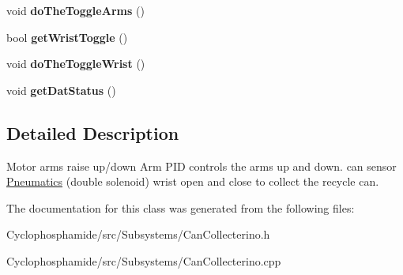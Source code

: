\begin{DoxyCompactItemize}
\item 
\hypertarget{class_can_collecterino_a62ef9056b5efd3bb50a1bc5fd60b1b05}{}void {\bfseries do\+The\+Toggle\+Arms} ()\label{class_can_collecterino_a62ef9056b5efd3bb50a1bc5fd60b1b05}

\item 
\hypertarget{class_can_collecterino_ab6ce305e5856f04f863e87b6df71a94d}{}bool {\bfseries get\+Wrist\+Toggle} ()\label{class_can_collecterino_ab6ce305e5856f04f863e87b6df71a94d}

\item 
\hypertarget{class_can_collecterino_a1ac8ee7f437264f34f37e94379d324dc}{}void {\bfseries do\+The\+Toggle\+Wrist} ()\label{class_can_collecterino_a1ac8ee7f437264f34f37e94379d324dc}

\item 
\hypertarget{class_can_collecterino_a66118988ad6367103a511e7bbf0a8a52}{}void {\bfseries get\+Dat\+Status} ()\label{class_can_collecterino_a66118988ad6367103a511e7bbf0a8a52}

\end{DoxyCompactItemize}


\subsection{Detailed Description}
Motor arms raise up/down Arm P\+I\+D controls the arms up and down. can sensor \hyperlink{class_pneumatics}{Pneumatics} (double solenoid) wrist open and close to collect the recycle can. 

The documentation for this class was generated from the following files\+:\begin{DoxyCompactItemize}
\item 
Cyclophosphamide/src/\+Subsystems/Can\+Collecterino.\+h\item 
Cyclophosphamide/src/\+Subsystems/Can\+Collecterino.\+cpp\end{DoxyCompactItemize}
